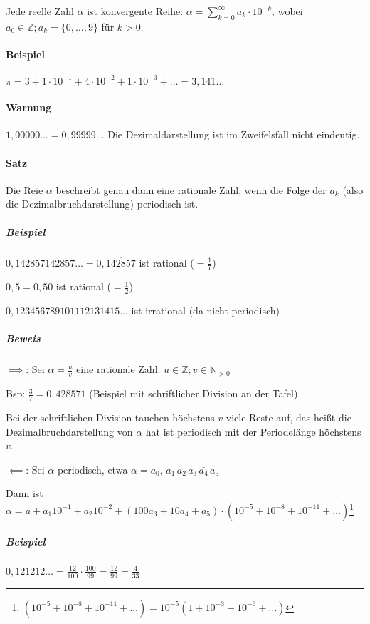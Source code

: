 \documentclass[14pt,a4paper]{article}
\newcommand{\N}{\ensuremath{\mathbb{N}}}
\newcommand{\Z}{\ensuremath{\mathbb{Z}}}
\begin{document}
  Jede reelle Zahl $\alpha$ ist konvergente Reihe: $ \alpha = \sum_{k=0}^\infty
  a_k \cdot 10^{-k}$, wobei $a_0 \in \Z ; a_k = \{0, \ldots, 9\}$ für $k > 0 $.

  \paragraph{Beispiel}
  $ \pi = 3 + 1 \cdot 10^{-1} + 4 \cdot 10^{-2} + 1 \cdot 10^{-3} + \ldots =
  3,141\ldots$

  \paragraph{Warnung}
  $1,00000\ldots = 0,99999\ldots$
  Die Dezimaldarstellung ist im Zweifelsfall nicht eindeutig.

  \paragraph{Satz}
  Die Reie $\alpha$ beschreibt genau dann eine rationale Zahl, wenn die Folge
  der $a_k$ (also die Dezimalbruchdarstellung) periodisch ist.

  \subparagraph{Beispiel}
  $0,142857142857\ldots = 0,\overline{142857}$ ist rational ($= \frac{1}{7}$)

  $0,5 = 0,5\overline{0}$ ist rational ($ = \frac{1}{2}$)

  $ 0,123456789101112131415\ldots $ ist irrational (da nicht periodisch)

  \subparagraph{Beweis}
  $\implies$: Sei $\alpha = \frac{u}{v}$ eine rationale Zahl: $ u \in \Z; v \in
  \N_{>0}$

  Bsp: $\frac{3}{7} = 0,\overline{428571} $ (Beispiel mit schriftlicher Division
  an der Tafel)

  Bei der schriftlichen Division tauchen höchstens $v$ viele Reste auf, das
  heißt die Dezimalbruchdarstellung von $\alpha$ hat ist periodisch mit der
  Periodelänge höchstens $v$.

  $\impliedby$: Sei $\alpha$ periodisch, etwa $\alpha =
  a_0,\,a_1\,a_2\,\overline{a_3\,a_4\,a_5}$

  Dann ist $\alpha = a + a_1 10^{-1} + a_2 10^{-2} + (100 a_3 + 10 a_4 + a_5)
  \cdot (10^{-5} + 10^{-8} + 10^{-11} + \ldots)$\;\;\;\footnote{ $ (10^{-5} + 10^{-8}
    + 10^{-11} + \ldots) = 10^{-5} (1 + 10^{-3} +
    10^{-6} + \ldots )$}
  
  \subparagraph{Beispiel}
  $ 0,121212\ldots = \frac{12}{100} \cdot \frac{100}{99} = \frac{12}{99} =
  \frac{4}{33} $
\end{document}
